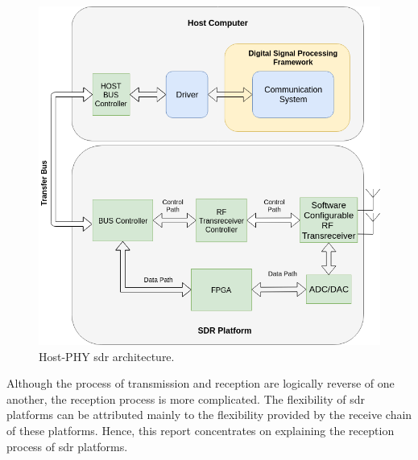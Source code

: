 \begin{figure}[h!]
\centering
\includegraphics[width=\textwidth]{Figure/Host_Phy.png}
\caption{Host-PHY \cite{nychis_enabling_nodate} \ac{sdr} architecture.}
\label{host_PHY}
\end{figure}

Although the process of transmission and reception are logically reverse of one another, the reception process is more complicated.
The flexibility of \ac{sdr} platforms can be attributed mainly to the flexibility provided by the receive chain of these platforms.
Hence, this report concentrates on explaining the reception process of \ac{sdr} platforms.

